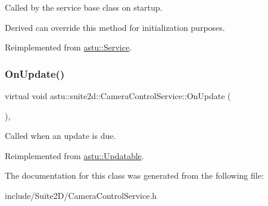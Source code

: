 Called by the service base class on startup.

Derived can override this method for initialization purposes. 

Reimplemented from \hyperlink{classastu_1_1Service_a357dc663e000b1f086f681ec3c459bfe}{astu\+::\+Service}.

\mbox{\label{classastu_1_1suite2d_1_1CameraControlService_ab547e4f6103448db59d1350695bed4e8}} 
\subsubsection{\texorpdfstring{On\+Update()}{OnUpdate()}}
{\footnotesize\ttfamily virtual void astu\+::suite2d\+::\+Camera\+Control\+Service\+::\+On\+Update (\begin{DoxyParamCaption}{ }\end{DoxyParamCaption})\hspace{0.3cm}{\ttfamily [override]}, {\ttfamily [virtual]}}

Called when an update is due. 

Reimplemented from \hyperlink{classastu_1_1Updatable_a925566c9770b95895c6c7294f9d51528}{astu\+::\+Updatable}.



The documentation for this class was generated from the following file\+:\begin{DoxyCompactItemize}
\item 
include/\+Suite2\+D/Camera\+Control\+Service.\+h\end{DoxyCompactItemize}
